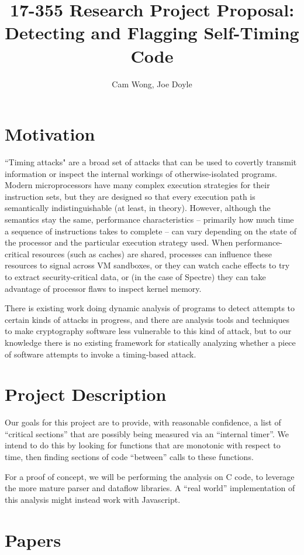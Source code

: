 \documentclass[twocolumn]{article}
\title{17-355 Research Project Proposal: Detecting and Flagging Self-Timing
Code}
\author{Cam Wong, Joe Doyle}
\begin{document}
\maketitle

\section{Motivation}

``Timing attacks" are a broad set of attacks that can be used to
covertly transmit information or inspect the internal workings of
otherwise-isolated programs. Modern microprocessors have many complex
execution strategies for their instruction sets, but they are designed
so that every execution path is semantically indistinguishable (at
least, in theory). However, although the semantics stay the same,
performance characteristics -- primarily how much time a sequence of
instructions takes to complete -- can vary depending on the state of
the processor and the particular execution strategy used. When
performance-critical resources (such as caches) are shared, processes
can influence these resources to signal across VM sandboxes, or they
can watch cache effects to try to extract security-critical data, or
(in the case of Spectre) they can take advantage of processor flaws to
inspect kernel memory.

There is existing work doing dynamic analysis of programs to detect
attempts to certain kinds of attacks in progress, and there are
analysis tools and techniques to make cryptography software less
vulnerable to this kind of attack, but to our knowledge there is no
existing framework for statically analyzing whether a piece of
software attempts to invoke a timing-based attack.

\section{Project Description}

Our goals for this project are to provide, with reasonable confidence,
a list of ``critical sections'' that are possibly being measured via
an ``internal timer''. We intend to do this by looking for functions that
are monotonic with respect to time, then finding sections of code
``between'' calls to these functions.

For a proof of concept, we will be performing the analysis on C code,
to leverage the more mature parser and dataflow libraries. A ``real world''
implementation of this analysis might instead work with Javascript.

\section{Papers}
\end{document}
